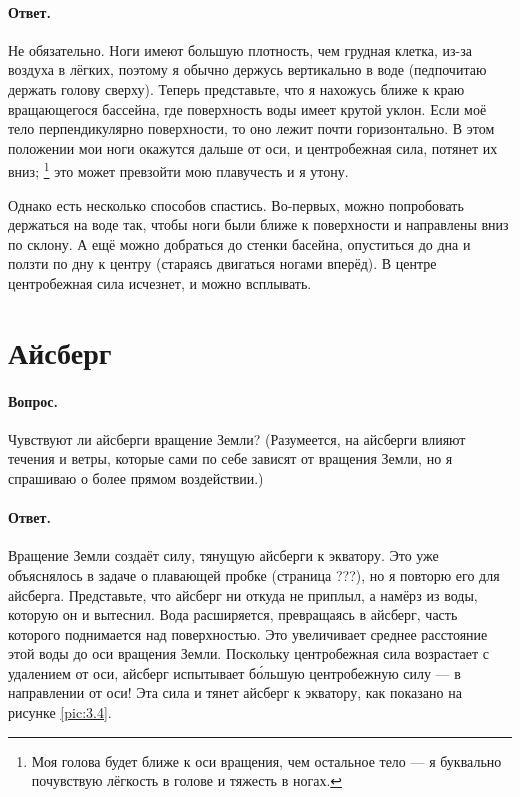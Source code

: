 \paragraph*{Ответ.}
Не обязательно.
Ноги имеют большую плотность, чем грудная клетка, из-за воздуха в лёгких, поэтому я обычно держусь вертикально в воде (педпочитаю держать голову сверху).
Теперь представьте, что я нахожусь ближе к краю вращающегося бассейна, где поверхность воды имеет крутой уклон. Если моё тело перпендикулярно поверхности, то оно лежит почти горизонтально.
В этом положении мои ноги окажутся дальше от оси, и центробежная сила, потянет их вниз;%
\footnote{Моя голова будет ближе к оси вращения, чем остальное тело --- я буквально почувствую лёгкость в голове и тяжесть в ногах.}
это может превзойти мою плавучесть и я утону.

Однако есть несколько способов спастись.
Во-первых, можно попробовать держаться на воде так, чтобы ноги были ближе к поверхности и направлены вниз по склону.
А ещё можно добраться до стенки басейна, опуститься до дна и ползти по дну к центру (стараясь двигаться ногами вперёд).
В центре центробежная сила исчезнет, и можно всплывать.

\section{Айсберг}

\paragraph*{Вопрос.} Чувствуют ли айсберги вращение Земли?
(Разумеется, на айсберги влияют течения и ветры, которые сами по себе зависят от вращения Земли, но я спрашиваю о более прямом воздействии.)

\paragraph*{Ответ.}
Вращение Земли создаёт силу, тянущую айсберги к экватору.
Это уже объяснялось в задаче о плавающей пробке (страница ???),
но я повторю его для айсберга.
Представьте, что айсберг ни откуда не приплыл, а намёрз из воды, которую он и вытеснил.
Вода расширяется, превращаясь в айсберг, часть которого поднимается над поверхностью.
Это увеличивает среднее расстояние этой воды до оси вращения Земли.
Поскольку центробежная сила возрастает с удалением от оси, айсберг испытывает б\'{о}льшую центробежную силу — в направлении от оси!
Эта сила и тянет айсберг к экватору, как показано на рисунке \ref{pic:3.4}.

